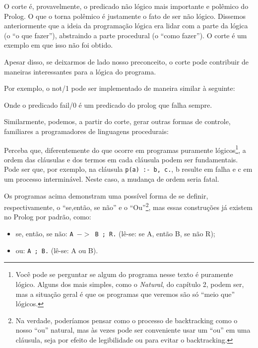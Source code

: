 \documentclass{article}
\theoremstyle{remark}
\begin{document}
O corte é, provavelmente, o predicado não lógico mais importante e polêmico do Prolog. O que o torna polêmico é justamente o fato de ser não lógico. Dissemos anteriormente que a ideia da programação lógica era lidar com a parte da lógica (o ``o que fazer''), abstraindo a parte procedural (o ``como fazer''). O corte é um exemplo em que isso não foi obtido.

Apesar disso, se deixarmos de lado nosso preconceito, o corte pode contribuir de maneiras interessantes para a lógica do programa.

Por exemplo, o not/1 pode ser implementado de maneira similar à seguinte:



Onde o predicado fail/0 é um predicado do prolog que falha sempre.

Similarmente, podemos, a partir do corte, gerar outras formas de controle, familiares a programadores de linguagens procedurais:





Perceba que, diferentemente do que ocorre em programas puramente lógicos\footnote{Você pode se perguntar se algum do programa nesse texto é puramente lógico. Alguns dos mais simples, como o \textit{Natural}, do capítulo 2, podem ser, mas a situação geral é que os programas que veremos são só ``meio que'' lógicos.}, a ordem das cláusulas e dos termos em cada cláusula podem ser fundamentais. Pode ser que, por exemplo, na cláusula {\tt p(a) :- b, c.}, b resulte em falha e c em um
processo interminável. Neste caso, a mudança de ordem seria fatal.

Os programas acima demonstram uma possível forma de se definir, respectivamente, o ``se,então, se não'' e o ``Ou''\footnote{Na verdade, poderíamos pensar como o processo de backtracking como o nosso ``ou'' natural, mas às vezes pode ser conveniente usar um ``ou'' em uma cláusula, seja por efeito de legibilidade ou para evitar o backtracking.}, mas essas construções já existem no Prolog por padrão, como:

\begin{itemize}
  \item se, então, se não: {\tt A $->$ B ; R.} (lê-se: se A, então B, se não R);
  \item ou: {\tt A ; B.} (lê-se: A ou B).
\end{itemize}


  \begin{thebibliography}{2}


  \end{thebibliography}
\end{document}
